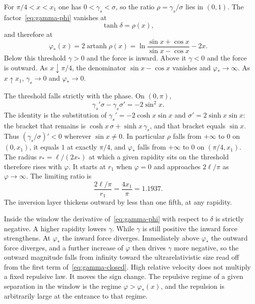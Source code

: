 \documentclass[a4paper]{article}
\begin{document}
For \(\pi/4<x<x_1\) one has \(0<\gamma_s<\sigma\), so the ratio \(\rho=\gamma_s/\sigma\) lies in \((0,1)\). The factor~\eqref{eq:gamma-phi} vanishes at
\[
\tanh\delta=\rho(x),
\]
and therefore at
\begin{equation}
\label{eq:phi-star}
\varphi_*(x)
  =2\operatorname{artanh}\rho(x)
  =\ln\frac{\sin x+\cos x}{\sin x-\cos x}-2x.
\end{equation}
Below this threshold \(\gamma>0\) and the force is inward. Above it \(\gamma<0\) and the force is outward. As \(x\downarrow\pi/4\), the denominator \(\sin x-\cos x\) vanishes and \(\varphi_*\to\infty\). As \(x\uparrow x_1\), \(\gamma_s\to 0\) and \(\varphi_*\to 0\).

The threshold falls strictly with the phase. On \((0,\pi)\),
\begin{equation}
\label{eq:rho-derivative}
\gamma_s'\sigma-\gamma_s\sigma'
  =-2\sin^{2}x.
\end{equation}
The identity is the substitution of \(\gamma_s'=-2\cosh x\sin x\) and \(\sigma'=2\sinh x\sin x\): the bracket that remains is \(\cosh x\,\sigma+\sinh x\,\gamma_s\), and that bracket equals \(\sin x\). Thus \((\gamma_s/\sigma)'<0\) wherever \(\sin x\neq 0\). In particular \(\rho\) falls from \(+\infty\) to \(0\) on \((0,x_1)\), it equals \(1\) at exactly \(\pi/4\), and \(\varphi_*\) falls from \(+\infty\) to \(0\) on \((\pi/4,x_1)\). The radius \(r_*=\ell/(2x_*)\) at which a given rapidity sits on the threshold therefore rises with \(\varphi\). It starts at \(r_1\) when \(\varphi=0\) and approaches \(2\ell/\pi\) as \(\varphi\to\infty\). The limiting ratio is
\begin{equation}
\label{eq:limit-ratio}
\frac{2\ell/\pi}{r_1}=\frac{4x_1}{\pi}=1.1937.
\end{equation}
The inversion layer thickens outward by less than one fifth, at any rapidity.

Inside the window the derivative of~\eqref{eq:gamma-phi} with respect to \(\delta\) is strictly negative. A higher rapidity lowers \(\gamma\). While \(\gamma\) is still positive the inward force strengthens. At \(\varphi_*\) the inward force diverges. Immediately above \(\varphi_*\) the outward force diverges, and a further increase of \(\varphi\) then drives \(\gamma\) more negative, so the outward magnitude falls from infinity toward the ultrarelativistic size read off from the first term of~\eqref{eq:gamma-closed}. High relative velocity does not multiply a fixed repulsive law. It moves the sign change. The repulsive regime of a given separation in the window is the regime \(\varphi>\varphi_*(x)\), and the repulsion is arbitrarily large at the entrance to that regime.
\end{document}
